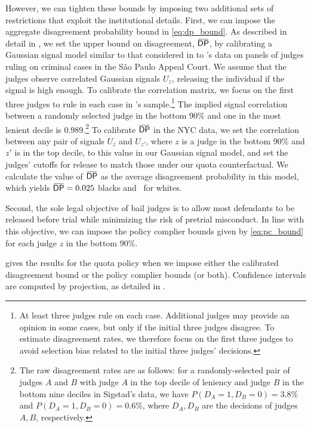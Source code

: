 \documentclass[12pt]{article}%
\theoremstyle{definition}
\newcommand\1{\operatorname{I}\indicatorfence}
\newcommand{\overbar}[1]{\mkern 1.5mu\overline{\mkern-1.5mu#1\mkern-1.5mu}%
  \mkern 1.5mu}%
\newcommand{\DP}{\mathsf{DP}}
\begin{document}
However, we can tighten these bounds by imposing two additional sets of
restrictions that exploit the institutional details. First, we can impose the aggregate disagreement probability bound in \cref{eq:dp_bound}. As described in detail in , we set the upper bound on disagreement, $\overbar{\DP}$, by calibrating a Gaussian signal model similar to that considered in
\textcite{cgy22} to \textcite{sigstad_monotonicity_2023}'s data on panels of judges ruling on criminal cases in the São Paulo Appeal Court. We assume that the judges observe correlated Gaussian signals $U_{z}$, releasing the
individual if the signal is high enough. To calibrate the correlation matrix, we focus on the first three judges to rule in each case in \textcite{sigstad_marginal_2024}'s sample.\footnote{At least three judges rule on each case. Additional judges may provide an opinion in some cases, but only if the initial three judges disagree. To estimate disagreement rates, we therefore focus on the first three judges to avoid selection bias related to the initial three judges' decisions.} The implied signal correlation between a randomly selected judge in the
bottom 90\% and one in the most lenient decile is 0.989.\footnote{The raw
  disagreement rates are as follows: for a randomly-selected pair of judges $A$
  and $B$ with judge $A$ in the top decile of leniency and judge $B$ in the
  bottom nine deciles in Sigstad's data, we have $P(D_A=1, D_B=0) = 3.8\%$ and
  $P(D_A=1, D_B=0) = 0.6\%$, where $D_A, D_B$ are the decisions of judges $A, B$, respectively.} To calibrate $\overbar{\DP}$ in the NYC data, we set the correlation between any pair of signals $U_{z}$ and $U_{z'}$, where $z$ is a judge in the bottom 90\% and $z'$ is in the top decile, to this value in our Gaussian signal model, and set the judges' cutoffs for release to match those under our quota
counterfactual. We calculate the value of $\overbar{\DP}$ as the average disagreement probability in this model,
which yields
$\overbar{\DP}=\nycDPb$ blacks and \nycDPw\ for whites.

Second, the sole legal
objective of bail judges is to allow most defendants to be released before trial
while minimizing the risk of pretrial misconduct. In line with this objective, we can impose the policy complier bounds given by \cref{eq:pc_bound} for
each judge $z$ in the bottom 90\%.

 gives the results for the quota policy when we impose either the calibrated disagreement bound or the policy complier bounds (or both). Confidence intervals are computed by projection, as detailed in
.
\end{document}
